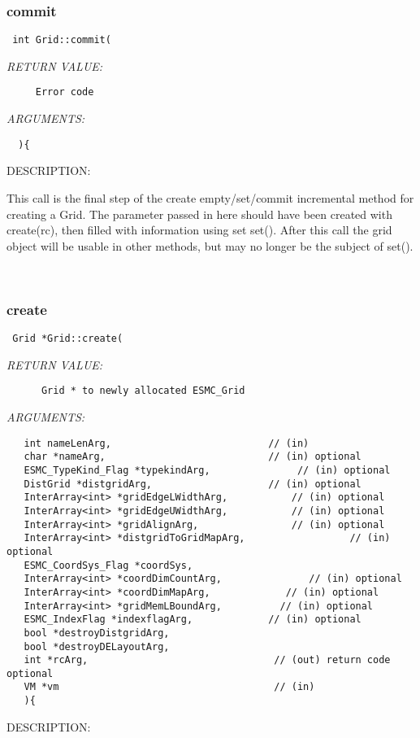 \subsubsection [commit] {commit}


  
\begin{verbatim} int Grid::commit(\end{verbatim}{\em RETURN VALUE:}
\begin{verbatim}     Error code\end{verbatim}{\em ARGUMENTS:}
\begin{verbatim}  ){\end{verbatim}
{\sf DESCRIPTION:\\ }


     This call is the final step of the create empty/set/commit incremental
   method for creating a Grid. The \gridArg parameter passed in here should
   have been created with create(rc), then filled with information using set 
   set().
   After this call the grid object will be usable in other methods, but may
   no longer be the subject of set(). 
 
\mbox{}\hrulefill\ 
 
\subsubsection [create] {create}


  
\begin{verbatim} Grid *Grid::create(\end{verbatim}{\em RETURN VALUE:}
\begin{verbatim}      Grid * to newly allocated ESMC_Grid\end{verbatim}{\em ARGUMENTS:}
\begin{verbatim}   int nameLenArg,                           // (in) 
   char *nameArg,                            // (in) optional
   ESMC_TypeKind_Flag *typekindArg,               // (in) optional
   DistGrid *distgridArg,                    // (in) optional
   InterArray<int> *gridEdgeLWidthArg,           // (in) optional
   InterArray<int> *gridEdgeUWidthArg,           // (in) optional
   InterArray<int> *gridAlignArg,                // (in) optional
   InterArray<int> *distgridToGridMapArg,                  // (in) optional
   ESMC_CoordSys_Flag *coordSys, 
   InterArray<int> *coordDimCountArg,               // (in) optional
   InterArray<int> *coordDimMapArg,             // (in) optional
   InterArray<int> *gridMemLBoundArg,          // (in) optional
   ESMC_IndexFlag *indexflagArg,             // (in) optional
   bool *destroyDistgridArg,
   bool *destroyDELayoutArg,
   int *rcArg,                                // (out) return code optional
   VM *vm                                     // (in)
   ){\end{verbatim}
{\sf DESCRIPTION:\\ }


